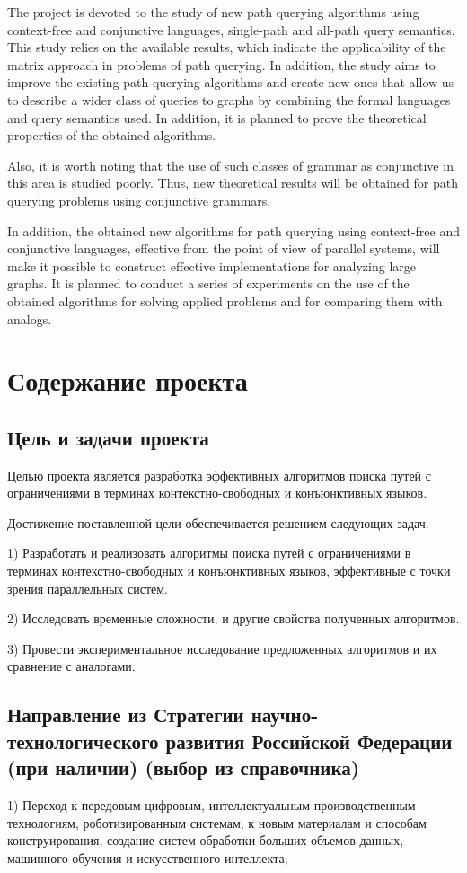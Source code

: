 \documentclass[12pt]{article}  %
\theoremstyle{remark}
\begin{document}
The project is devoted to the study of new path querying algorithms using context-free and conjunctive languages, single-path and all-path query semantics. This study relies on the available results, which indicate the applicability of the matrix approach in problems of path querying. In addition, the study aims to improve the existing path querying algorithms and create new ones that allow us to describe a wider class of queries to graphs by combining the formal languages and query semantics used. In addition, it is planned to prove the theoretical properties of the obtained algorithms.

Also, it is worth noting that the use of such classes of grammar as conjunctive in this area is studied poorly. Thus, new theoretical results will be obtained for path querying problems using conjunctive grammars.

In addition, the obtained new algorithms for path querying using context-free and conjunctive languages, effective from the point of view of parallel systems, will make it possible to construct effective implementations for analyzing large graphs. It is planned to conduct a series of experiments on the use of the obtained algorithms for solving applied problems and for comparing them with analogs.

\section{Содержание проекта}

\subsection{Цель и задачи проекта}
Целью проекта является разработка эффективных алгоритмов поиска путей с ограничениями в терминах контекстно-свободных и конъюнктивных языков.

Достижение поставленной цели обеспечивается решением следующих задач.

1) Разработать и реализовать алгоритмы поиска путей с ограничениями в терминах контекстно-свободных и конъюнктивных языков, эффективные с точки зрения параллельных систем.

2) Исследовать временные сложности, и другие свойства полученных алгоритмов.

3) Провести экспериментальное исследование предложенных алгоритмов и их сравнение с аналогами.

\subsection{Направление из Стратегии научно-технологического развития Российской Федерации (при наличии) (выбор из справочника)}
1) Переход к передовым цифровым, интеллектуальным производственным технологиям, роботизированным системам, к новым материалам и способам конструирования, создание систем обработки больших объемов данных, машинного обучения и искусственного интеллекта;
\end{document}

